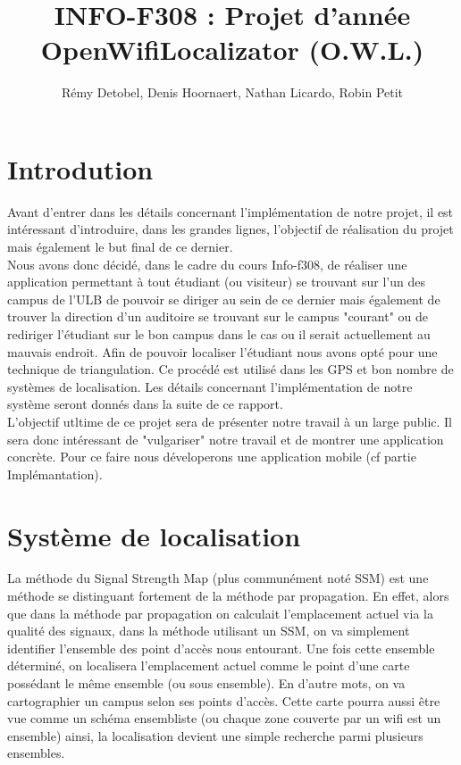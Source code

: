 \documentclass[a4paper,11pt]{article}
\title{INFO-F308 : Projet d'année \\ OpenWifiLocalizator (O.W.L.)}
\author{Rémy Detobel, Denis Hoornaert, Nathan Licardo, Robin Petit}
\begin{document}
\maketitle

\section{Introdution}
  Avant d'entrer dans les détails concernant l'implémentation de notre projet, il est intéressant d'introduire, dans les grandes lignes, l'objectif de réalisation du projet mais également le but final de ce dernier.\\
Nous avons donc décidé, dans le cadre du cours Info-f308, de réaliser une application permettant à tout étudiant (ou visiteur) se trouvant sur l'un des campus de l'ULB de pouvoir se diriger au sein de ce dernier mais également de trouver la direction d'un auditoire se trouvant sur le campus "courant" ou de rediriger l'étudiant sur le bon campus dans le cas ou il serait actuellement au mauvais endroit. Afin de pouvoir localiser l'étudiant nous avons opté pour une technique de triangulation. Ce procédé est utilisé dans les GPS et bon nombre de systèmes de localisation. Les détails concernant l'implémentation de notre système seront donnés dans la suite de ce rapport.\\
L'objectif utltime de ce projet sera de présenter notre travail à un large public. Il sera donc intéressant de "vulgariser" notre travail et de montrer une application concrète. Pour ce faire nous déveloperons une application mobile (cf partie Implémantation).

\section{Système de localisation}
  La méthode du Signal Strength Map (plus communément noté SSM) est une méthode se distinguant fortement de la méthode par propagation. En effet, alors que dans la méthode par propagation on calculait l'emplacement actuel via la qualité des signaux, dans la méthode utilisant un SSM, on va simplement identifier l'ensemble des point d'accès nous entourant. Une fois cette ensemble déterminé, on localisera l'emplacement actuel comme le point d'une carte possédant le même ensemble (ou sous ensemble).
  En d'autre mots, on va cartographier un campus selon ses points d'accès. Cette carte pourra aussi être vue comme un schéma ensembliste (ou chaque zone couverte par un wifi est un ensemble) ainsi, la localisation devient une simple recherche parmi plusieurs ensembles.
    
\end{document}
